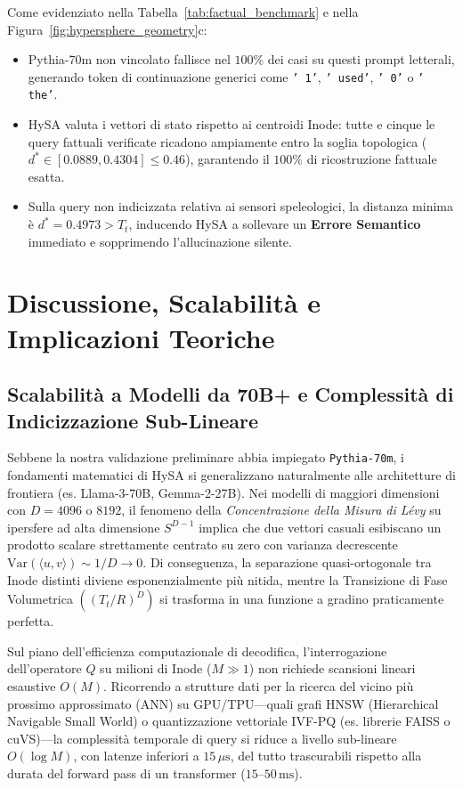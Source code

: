 \documentclass[11pt,a4paper]{article}
\theoremstyle{definition}
\begin{document}
Come evidenziato nella Tabella~\ref{tab:factual_benchmark} e nella Figura~\ref{fig:hypersphere_geometry}c:
\begin{itemize}[leftmargin=*, itemsep=2.0pt]
    \item Pythia-70m non vincolato fallisce nel $100\%$ dei casi su questi prompt letterali, generando token di continuazione generici come \texttt{' 1'}, \texttt{' used'}, \texttt{' 0'} o \texttt{' the'}.
    \item HySA valuta i vettori di stato rispetto ai centroidi Inode: tutte e cinque le query fattuali verificate ricadono ampiamente entro la soglia topologica ($d^* \in [0.0889, 0.4304] \le 0.46$), garantendo il $100\%$ di ricostruzione fattuale esatta.
    \item Sulla query non indicizzata relativa ai sensori speleologici, la distanza minima è $d^* = 0.4973 > T_t$, inducendo HySA a sollevare un \textbf{Errore Semantico} immediato e sopprimendo l'allucinazione silente.
\end{itemize}

\section{Discussione, Scalabilità e Implicazioni Teoriche}

\subsection{Scalabilità a Modelli da 70B+ e Complessità di Indicizzazione Sub-Lineare}
Sebbene la nostra validazione preliminare abbia impiegato \texttt{Pythia-70m}, i fondamenti matematici di HySA si generalizzano naturalmente alle architetture di frontiera (es. Llama-3-70B, Gemma-2-27B). Nei modelli di maggiori dimensioni con $D=4096$ o $8192$, il fenomeno della \textit{Concentrazione della Misura di Lévy} su ipersfere ad alta dimensione $S^{D-1}$ implica che due vettori casuali esibiscano un prodotto scalare strettamente centrato su zero con varianza decrescente $\mathrm{Var}(\langle u, v \rangle) \sim 1/D \to 0$. Di conseguenza, la separazione quasi-ortogonale tra Inode distinti diviene esponenzialmente più nitida, mentre la Transizione di Fase Volumetrica $((T_t/R)^D)$ si trasforma in una funzione a gradino praticamente perfetta.

Sul piano dell'efficienza computazionale di decodifica, l'interrogazione dell'operatore $Q$ su milioni di Inode ($M \gg 1$) non richiede scansioni lineari esaustive $O(M)$. Ricorrendo a strutture dati per la ricerca del vicino più prossimo approssimato (ANN) su GPU/TPU---quali grafi HNSW (Hierarchical Navigable Small World) o quantizzazione vettoriale IVF-PQ (es. librerie FAISS o cuVS)---la complessità temporale di query si riduce a livello sub-lineare $O(\log M)$, con latenze inferiori a $15\,\mu\text{s}$, del tutto trascurabili rispetto alla durata del forward pass di un transformer ($15\text{--}50\,\text{ms}$).
\end{document}
